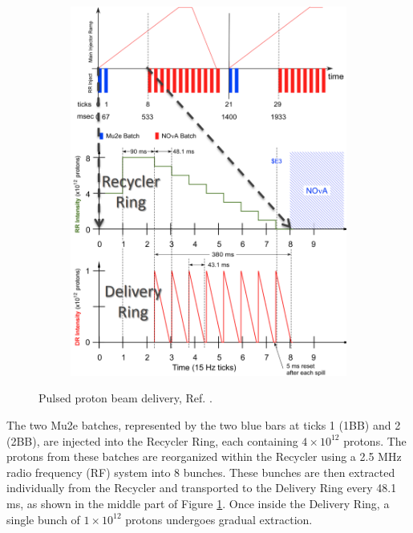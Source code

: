 \begin{figure}[!h]
\begin{subfigure}[b]{0.7\linewidth}
         \includegraphics[scale = 0.39]{figures/png/Screenshot_20240301_151418.png}
         \label{fig:deliver}
     \end{subfigure}
     \caption[The pulsed proton beam delivery.]{Pulsed proton beam delivery, Ref. \cite{accelerator}.}
        \label{fig:three graphs1}
\end{figure}
The two Mu2e batches, represented by the two blue bars at ticks 1 (1BB) and 2 (2BB), are injected 
into the Recycler Ring, each containing $4 \times 10^{12}$ protons. The 
protons from these batches are reorganized within the Recycler using a 2.5 
MHz radio frequency (RF) system into 8 bunches. These bunches are then extracted 
individually from the Recycler and transported to the Delivery Ring every 48.1 ms, 
as shown in the middle part of Figure \ref{fig:deliver}. Once inside the Delivery 
Ring, a single bunch of $1 \times 10^{12}$ protons undergoes gradual extraction. 
